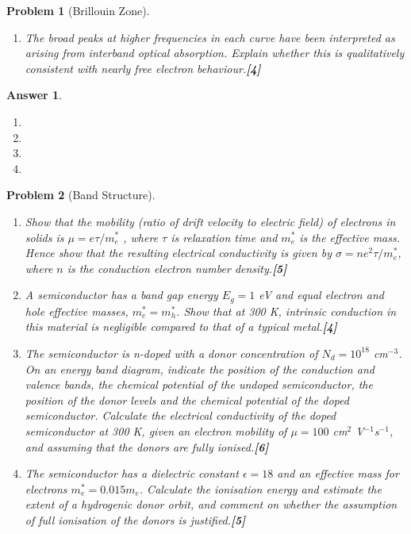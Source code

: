 \documentclass[a4paper]{article}
\newtheorem{ans}{Answer}[subsection]
\theoremstyle{new}
\newtheorem{qns}{Problem}[subsection]
\begin{document}
\begin{qns}[Brillouin Zone]
\begin{enumerate}[label=(\roman*)]
\begin{figure}[H]
\end{figure}
\item The broad peaks at higher frequencies in each curve have been interpreted as arising from interband optical absorption. Explain whether this is qualitatively consistent with nearly free electron behaviour.\hfill\textbf{[4]}
\end{enumerate}
\end{qns}
\newpage
\begin{ans}\leavevmode
\begin{enumerate}[label=(\roman*)]
\item

\item 



\item

\item

\end{enumerate}
\end{ans}
\newpage
\begin{qns}[Band Structure]\leavevmode
\begin{enumerate}[label=(\roman*)]
\item Show that the mobility (ratio of drift velocity to electric field) of electrons in solids is $\mu=e\tau/m_e^*$ , where $\tau$ is relaxation time and $m_e^*$ is the effective mass. Hence show that the resulting electrical conductivity is given by $\sigma=ne^2\tau/m_e^*$, where $n$ is the conduction electron number density.\hfill\textbf{[5]}
\item A semiconductor has a band gap energy $E_g = 1$ eV and equal electron and hole effective masses, $m_e^*=m_h^*$. Show that at 300 K, intrinsic conduction in this material is negligible compared to that of a typical metal.\hfill\textbf{[4]}
\item The semiconductor is n-doped with a donor concentration of $N_d = 10^{18}$ cm$^{−3}$. On an energy band diagram, indicate the position of the conduction and valence bands, the chemical potential of the undoped semiconductor, the position of the donor levels and the chemical potential of the doped semiconductor. Calculate the electrical conductivity of the doped semiconductor at 300 K, given an electron mobility of $\mu= 100$ cm$^2$ V$^{−1}$s$^{−1}$, and assuming that the donors are fully ionised.\hfill\textbf{[6]}
\item The semiconductor has a dielectric constant $\epsilon=18$ and an effective mass for electrons $m_e^* = 0.015m_e$. Calculate the ionisation energy and estimate the extent of a hydrogenic donor orbit, and comment on whether the assumption of full ionisation of the donors is justified.\hfill\textbf{[5]}

\begin{mdframed}
\end{mdframed}
\end{enumerate}
\end{qns}
\end{document}
